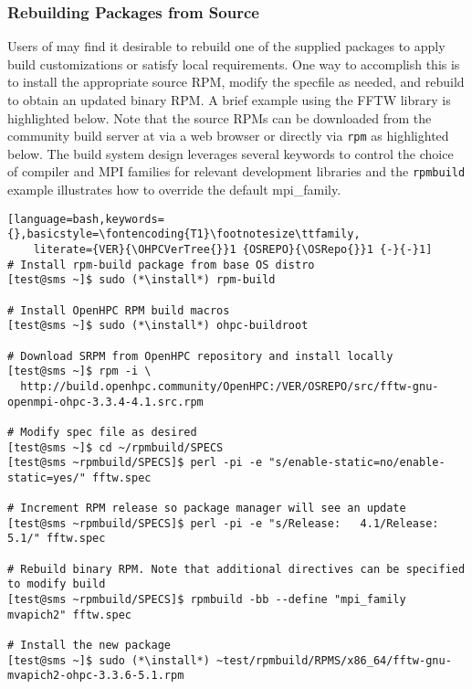 \clearpage
\subsubsection{Rebuilding Packages from Source}  \label{appendix:rpmbuild}

Users of \OHPC{} may find it desirable to rebuild one of the supplied packages
to apply build customizations or satisfy local requirements. One way to
accomplish this is to install the appropriate source RPM, modify the specfile
as needed, and rebuild to obtain an updated binary RPM. A brief example using
the FFTW library is highlighted below.  Note that the source RPMs can be downloaded from the
community build server at \href{https://build.openhpc.community}
{\color{blue}{https://build.openhpc.community}} via a web browser or directly
via \texttt{rpm} as highlighted below. The \OHPC{} build system design
leverages several keywords to control the choice of compiler and MPI families
for relevant development libraries and the \texttt{rpmbuild} example
illustrates how to override the default mpi\_family.

\begin{lstlisting}[language=bash,keywords={},basicstyle=\fontencoding{T1}\footnotesize\ttfamily,
    literate={VER}{\OHPCVerTree{}}1 {OSREPO}{\OSRepo{}}1 {-}{-}1]
# Install rpm-build package from base OS distro
[test@sms ~]$ sudo (*\install*) rpm-build

# Install OpenHPC RPM build macros
[test@sms ~]$ sudo (*\install*) ohpc-buildroot

# Download SRPM from OpenHPC repository and install locally
[test@sms ~]$ rpm -i \
  http://build.openhpc.community/OpenHPC:/VER/OSREPO/src/fftw-gnu-openmpi-ohpc-3.3.4-4.1.src.rpm

# Modify spec file as desired
[test@sms ~]$ cd ~/rpmbuild/SPECS
[test@sms ~rpmbuild/SPECS]$ perl -pi -e "s/enable-static=no/enable-static=yes/" fftw.spec

# Increment RPM release so package manager will see an update
[test@sms ~rpmbuild/SPECS]$ perl -pi -e "s/Release:   4.1/Release:   5.1/" fftw.spec

# Rebuild binary RPM. Note that additional directives can be specified to modify build
[test@sms ~rpmbuild/SPECS]$ rpmbuild -bb --define "mpi_family mvapich2" fftw.spec

# Install the new package
[test@sms ~]$ sudo (*\install*) ~test/rpmbuild/RPMS/x86_64/fftw-gnu-mvapich2-ohpc-3.3.6-5.1.rpm
\end{lstlisting}
